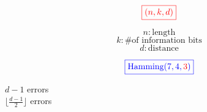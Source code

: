 
\begin{frame}
  \[
	\textcolor{red}{\boxed{(n, k, d)}}
  \]


  \pause
  \[
	n: \text{length}
  \]
  \[
	k: \text{\# of information bits}
  \]
  \[
	d: \text{distance}
  \]
\end{frame}

\begin{frame}
  \[
	\textcolor{blue}{\boxed{\text{Hamming} (7, 4, \textcolor{red}{3})}}
  \]


  \pause
  \begin{center}
	 $d-1$ errors \\[6pt]
	 $\lfloor \frac{d-1}{2} \rfloor$ errors
  \end{center}
\end{frame}
